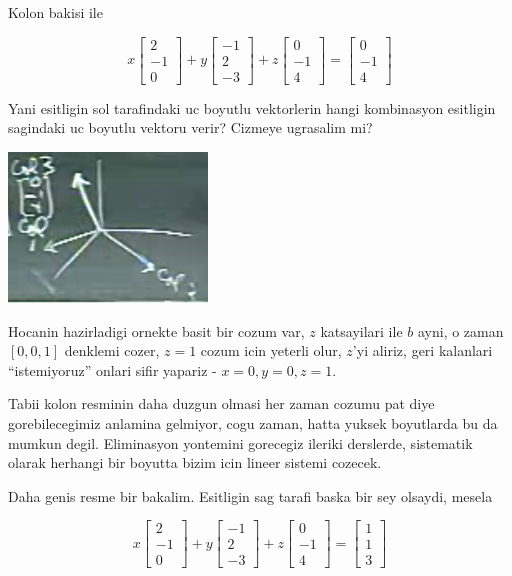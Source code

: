 \documentclass[12pt,fleqn]{article}\usepackage{../common}
\begin{document}
Kolon bakisi ile

$$ 
x 
\left[\begin{array}{r}
2 \\
-1 \\
0
\end{array}\right]
+
y
\left[\begin{array}{r}
-1 \\
2 \\
-3
\end{array}\right]
+
z 
\left[\begin{array}{r}
0 \\
-1 \\
4
\end{array}\right]
=
\left[\begin{array}{r}
0 \\
-1 \\
4
\end{array}\right]
 $$

Yani esitligin sol tarafindaki uc boyutlu vektorlerin hangi kombinasyon
esitligin sagindaki uc boyutlu vektoru verir? Cizmeye ugrasalim mi? 

\includegraphics[height=4cm]{1_08.png}

Hocanin hazirladigi ornekte basit bir cozum var, $z$ katsayilari ile $b$
ayni, o zaman $[0,0,1]$ denklemi cozer, $z=1$ cozum icin yeterli olur,
$z$'yi aliriz, geri kalanlari ``istemiyoruz'' onlari sifir yapariz -
$x=0,y=0,z=1$.

Tabii kolon resminin daha duzgun olmasi her zaman cozumu pat diye
gorebilecegimiz anlamina gelmiyor, cogu zaman, hatta yuksek boyutlarda bu
da mumkun degil. Eliminasyon yontemini gorecegiz ileriki derslerde,
sistematik olarak herhangi bir boyutta bizim icin lineer sistemi cozecek. 

Daha genis resme bir bakalim. Esitligin sag tarafi baska bir sey olsaydi,
mesela

$$ 
x 
\left[\begin{array}{r}
2 \\
-1 \\
0
\end{array}\right]
+
y
\left[\begin{array}{r}
-1 \\
2 \\
-3
\end{array}\right]
+
z 
\left[\begin{array}{r}
0 \\
-1 \\
4
\end{array}\right]
=
\left[\begin{array}{r}
1 \\
1 \\
3
\end{array}\right]
 $$
\end{document}
